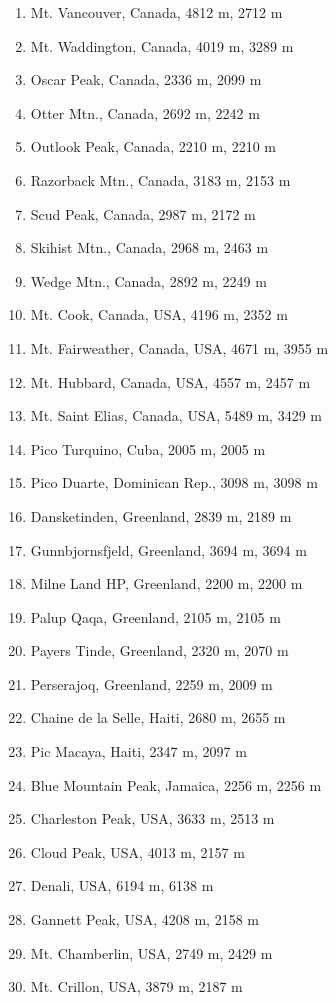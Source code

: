 \documentclass[10pt,twocolumn,letterpaper]{article}
\begin{document}
\begin{flushleft}
\begin{enumerate}
    \item Mt. Vancouver, Canada, 4812 m, 2712 m
    \item Mt. Waddington, Canada, 4019 m, 3289 m
    \item Oscar Peak, Canada, 2336 m, 2099 m
    \item Otter Mtn., Canada, 2692 m, 2242 m
    \item Outlook Peak, Canada, 2210 m, 2210 m
    \item Razorback Mtn., Canada, 3183 m, 2153 m
    \item Scud Peak, Canada, 2987 m, 2172 m
    \item Skihist Mtn., Canada, 2968 m, 2463 m
    \item Wedge Mtn., Canada, 2892 m, 2249 m
    \item Mt. Cook, Canada, USA, 4196 m, 2352 m
    \item Mt. Fairweather, Canada, USA, 4671 m, 3955 m
    \item Mt. Hubbard, Canada, USA, 4557 m, 2457 m
    \item Mt. Saint Elias, Canada, USA, 5489 m, 3429 m
    \item Pico Turquino, Cuba, 2005 m, 2005 m
    \item Pico Duarte, Dominican Rep., 3098 m, 3098 m
    \item Dansketinden, Greenland, 2839 m, 2189 m
    \item Gunnbjornsfjeld, Greenland, 3694 m, 3694 m
    \item Milne Land HP, Greenland, 2200 m, 2200 m
    \item Palup Qaqa, Greenland, 2105 m, 2105 m
    \item Payers Tinde, Greenland, 2320 m, 2070 m
    \item Perserajoq, Greenland, 2259 m, 2009 m
    \item Chaine de la Selle, Haiti, 2680 m, 2655 m
    \item Pic Macaya, Haiti, 2347 m, 2097 m
    \item Blue Mountain Peak, Jamaica, 2256 m, 2256 m
    \item Charleston Peak, USA, 3633 m, 2513 m
    \item Cloud Peak, USA, 4013 m, 2157 m
    \item Denali, USA, 6194 m, 6138 m
    \item Gannett Peak, USA, 4208 m, 2158 m
    \item Mt. Chamberlin, USA, 2749 m, 2429 m
    \item Mt. Crillon, USA, 3879 m, 2187 m

\end{enumerate}
\end{flushleft}
\end{document}
